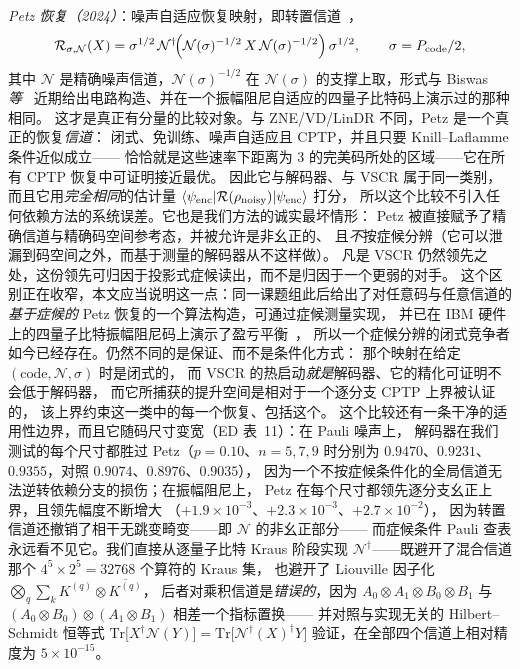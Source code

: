 \documentclass[11pt,a4paper]{article}
\newcommand{\ket}[1]{\lvert #1\rangle}
\newcommand{\bra}[1]{\langle #1\rvert}
\newcommand{\tr}{\mathrm{Tr}}
\begin{document}
\emph{Petz 恢复（2024）}：噪声自适应恢复映射，即转置信道~\cite{petz_map,beny_optimal}，
\begin{equation}
\mathcal{R}_{\sigma,\mathcal N}(X)=\sigma^{1/2}\,
\mathcal N^\dagger\!\Big(\mathcal N(\sigma)^{-1/2}\,X\,
\mathcal N(\sigma)^{-1/2}\Big)\,\sigma^{1/2},
\qquad \sigma=P_{\rm code}/2,
\label{eq:petz}
\end{equation}
其中 $\mathcal N$ 是精确噪声信道，$\mathcal N(\sigma)^{-1/2}$ 在
$\mathcal N(\sigma)$ 的支撑上取，形式与 Biswas \emph{等}~\cite{biswas_petz}
近期给出电路构造、并在一个振幅阻尼自适应的四量子比特码上演示过的那种相同。
这才是真正有分量的比较对象。与 ZNE/VD/LinDR 不同，Petz 是一个真正的恢复\emph{信道}：
闭式、免训练、噪声自适应且 CPTP，并且只要 Knill--Laflamme 条件近似成立——
恰恰就是这些速率下距离为 $3$ 的完美码所处的区域——它在所有 CPTP 恢复中可证明接近最优。
因此它与解码器、与 VSCR 属于同一类别，而且它用\emph{完全相同}的估计量
$\bra{\psi_{\rm enc}}\mathcal R(\rho_{\rm noisy})\ket{\psi_{\rm enc}}$ 打分，
所以这个比较不引入任何依赖方法的系统误差。它也是我们方法的诚实最坏情形：
Petz 被直接赋予了精确信道与精确码空间参考态，并被允许是非幺正的、
且\emph{不}按症候分辨（它可以泄漏到码空间之外，而基于测量的解码器从不这样做）。
凡是 VSCR 仍然领先之处，这份领先可归因于投影式症候读出，而不是归因于一个更弱的对手。
这个区别正在收窄，本文应当说明这一点：同一课题组此后给出了对任意码与任意信道的
\emph{基于症候的} Petz 恢复的一个算法构造，可通过症候测量实现，
并已在 IBM 硬件上的四量子比特振幅阻尼码上演示了盈亏平衡~\cite{biswas_syndrome_petz}，
所以一个症候分辨的闭式竞争者如今已经存在。仍然不同的是保证、而不是条件化方式：
那个映射在给定 $(\mathrm{code},\mathcal N,\sigma)$ 时是闭式的，
而 VSCR 的热启动\emph{就是}解码器、它的精化可证明不会低于解码器，
而它所捕获的提升空间是相对于一个逐分支 CPTP 上界被认证的，
该上界约束这一类中的每一个恢复、包括这个。
这个比较还有一条干净的适用性边界，而且它随码尺寸变宽（ED 表~11）：在 Pauli 噪声上，
解码器在我们测试的每个尺寸都胜过 Petz（$p=0.10$、$n=5,7,9$ 时分别为
$0.9470$、$0.9231$、$0.9355$，对照 $0.9074$、$0.8976$、$0.9035$），
因为一个不按症候条件化的全局信道无法逆转依赖分支的损伤；在振幅阻尼上，
Petz 在每个尺寸都领先逐分支幺正上界，且领先幅度不断增大
（$+1.9\times10^{-3}$、$+2.3\times10^{-3}$、$+2.7\times10^{-2}$），
因为转置信道还撤销了相干无跳变畸变——即 $\mathcal N$ 的非幺正部分——
而症候条件 Pauli 查表永远看不见它。我们直接从逐量子比特 Kraus 阶段实现
$\mathcal N^\dagger$——既避开了混合信道那个 $4^5\!\times\!2^5=32768$ 个算符的 Kraus 集，
也避开了 Liouville 因子化 $\bigotimes_q\sum_k K^{(q)}\!\otimes\!\overline{K^{(q)}}$，
后者对乘积信道是\emph{错误的}，因为
$A_0\!\otimes\!A_1\!\otimes\!B_0\!\otimes\!B_1$ 与
$(A_0\!\otimes\!B_0)\!\otimes\!(A_1\!\otimes\!B_1)$ 相差一个指标置换——
并对照与实现无关的 Hilbert--Schmidt 恒等式
$\tr\!\big[X^\dagger\mathcal N(Y)\big]=\tr\!\big[\mathcal N^\dagger(X)^\dagger Y\big]$
验证，在全部四个信道上相对精度为 $5\times10^{-15}$。
\end{document}
